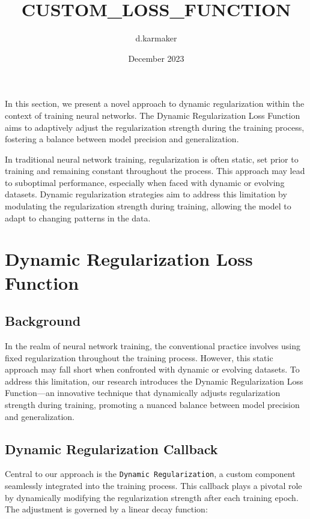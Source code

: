 \documentclass{article}
\title{CUSTOM_LOSS_FUNCTION}
\author{d.karmaker }
\date{December 2023}
\begin{document}
\maketitle



In this section, we present a novel approach to dynamic regularization within the context of training neural networks. The Dynamic Regularization Loss Function aims to adaptively adjust the regularization strength during the training process, fostering a balance between model precision and generalization.

In traditional neural network training, regularization is often static, set prior to training and remaining constant throughout the process. This approach may lead to suboptimal performance, especially when faced with dynamic or evolving datasets. Dynamic regularization strategies aim to address this limitation by modulating the regularization strength during training, allowing the model to adapt to changing patterns in the data.




\section{Dynamic Regularization Loss Function}

\subsection{Background}

In the realm of neural network training, the conventional practice involves using fixed regularization throughout the training process. However, this static approach may fall short when confronted with dynamic or evolving datasets. To address this limitation, our research introduces the Dynamic Regularization Loss Function—an innovative technique that dynamically adjusts regularization strength during training, promoting a nuanced balance between model precision and generalization.

\subsection{Dynamic Regularization Callback}

Central to our approach is the \texttt{Dynamic Regularization}, a custom component seamlessly integrated into the training process. This callback plays a pivotal role by dynamically modifying the regularization strength after each training epoch. The adjustment is governed by a linear decay function:
\end{document}
